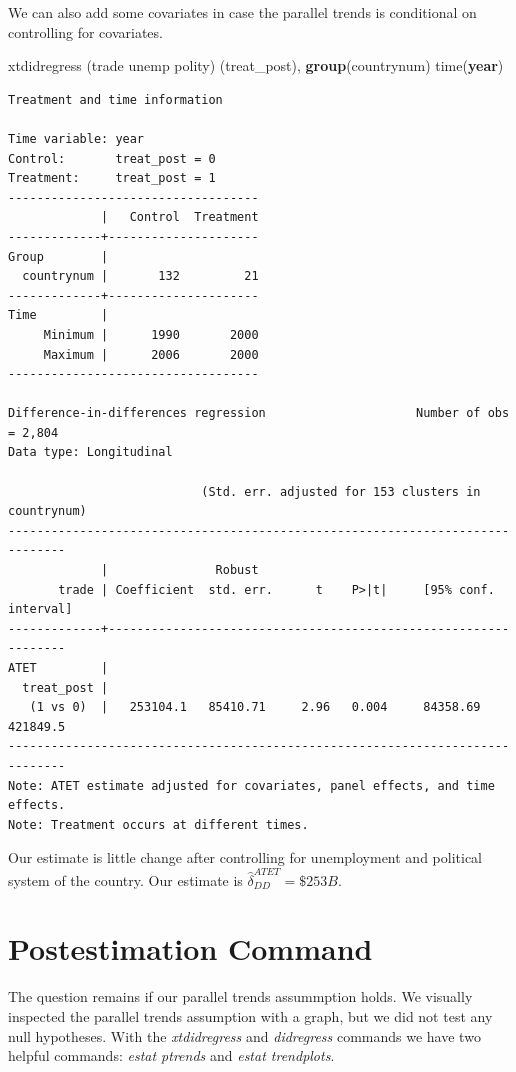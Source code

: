 \documentclass[
]{book}
\newenvironment{Shaded}{\begin{snugshade}}{\end{snugshade}}
\newcommand{\FunctionTok}[1]{\textcolor[rgb]{0.13,0.29,0.53}{\textbf{#1}}}
\newcommand{\NormalTok}[1]{#1}
\begin{document}
We can also add some covariates in case the parallel trends is conditional on controlling for covariates.

\begin{Shaded}
\begin{Highlighting}[]
\NormalTok{xtdidregress (trade unemp polity) (treat\_post), }\FunctionTok{group}\NormalTok{(countrynum) time(}\FunctionTok{year}\NormalTok{)}
\end{Highlighting}
\end{Shaded}

\begin{verbatim}
Treatment and time information

Time variable: year
Control:       treat_post = 0
Treatment:     treat_post = 1
-----------------------------------
             |   Control  Treatment
-------------+---------------------
Group        |
  countrynum |       132         21
-------------+---------------------
Time         |
     Minimum |      1990       2000
     Maximum |      2006       2000
-----------------------------------

Difference-in-differences regression                     Number of obs = 2,804
Data type: Longitudinal

                           (Std. err. adjusted for 153 clusters in countrynum)
------------------------------------------------------------------------------
             |               Robust
       trade | Coefficient  std. err.      t    P>|t|     [95% conf. interval]
-------------+----------------------------------------------------------------
ATET         |
  treat_post |
   (1 vs 0)  |   253104.1   85410.71     2.96   0.004     84358.69    421849.5
------------------------------------------------------------------------------
Note: ATET estimate adjusted for covariates, panel effects, and time effects.
Note: Treatment occurs at different times.
\end{verbatim}

Our estimate is little change after controlling for unemployment and political system of the country. Our estimate is \(\hat{\delta}^{ATET}_{DD}=\$253B\).

\chapter{Postestimation Command}\label{postestimation-command}

The question remains if our parallel trends assummption holds. We visually inspected the parallel trends assumption with a graph, but we did not test any null hypotheses. With the \emph{xtdidregress} and \emph{didregress} commands we have two helpful commands: \emph{estat ptrends} and \emph{estat trendplots}.
\end{document}
